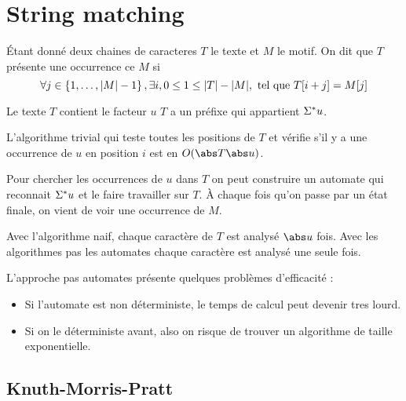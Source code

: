 \section{String matching}

\begin{definition}
	Étant donné deux chaines de caracteres $T$ le texte et $M$ le motif.
	On dit que $T$ présente une occurrence ce $M$ si
	$$\forall j \in \left\{1,\ldots,|M| -1\right\}, \exists i, 0 \leq 1 \leq |T| - |M|, \text{ tel que } T[i + j] = M[j]$$
\end{definition}

\begin{remarque}
	Le texte $T$ contient le facteur $u$ \ssi $T$ a un préfixe qui appartient $\Sigma^{*} u$.
\end{remarque}

\begin{remarque}
	L'algorithme trivial qui teste toutes les positions de $T$ et vérifie s'il y a une occurrence de $u$ en position $i$ est en $O(\abs T \abs u)$.
\end{remarque}

\begin{remarque}
	Pour chercher les occurrences de $u$ dans $T$ on peut construire un automate qui reconnait $\Sigma^{*} u$ et le faire travailler sur $T$.
	À chaque fois qu'on passe par un état finale, on vient de voir une occurrence de $M$.
\end{remarque}

\begin{remarque}
	Avec l'algorithme naif, chaque caractère de $T$ est analysé $\abs u$ fois. Avec les algorithmes pas les automates chaque caractère est analysé une seule fois.
\end{remarque}

\begin{remarque}
	L'approche pas automates présente quelques problèmes d'efficacité :
	\begin{itemize}
		\item Si l'automate est non déterministe, le temps de calcul peut devenir tres lourd.
		\item Si on le déterministe avant, also on risque de trouver un algorithme de taille exponentielle.
	\end{itemize}
\end{remarque}

\subsection{Knuth-Morris-Pratt}

